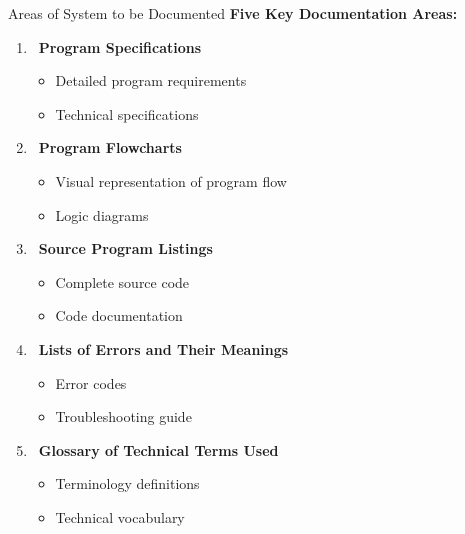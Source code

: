\documentclass[aspectratio=169]{beamer}
\begin{document}
\begin{frame}{Areas of System to be Documented}
    \textbf{Five Key Documentation Areas:}
    
    \begin{enumerate}
        \item\, \textbf{Program Specifications}
        \begin{itemize}
            \item Detailed program requirements
            \item Technical specifications
        \end{itemize}
        
        \item\, \textbf{Program Flowcharts}
        \begin{itemize}
            \item Visual representation of program flow
            \item Logic diagrams
        \end{itemize}
        
        \item\, \textbf{Source Program Listings}
        \begin{itemize}
            \item Complete source code
            \item Code documentation
        \end{itemize}
        
        \item\, \textbf{Lists of Errors and Their Meanings}
        \begin{itemize}
            \item Error codes
            \item Troubleshooting guide
        \end{itemize}
        
        \item\, \textbf{Glossary of Technical Terms Used}
        \begin{itemize}
            \item Terminology definitions
            \item Technical vocabulary
        \end{itemize}
    \end{enumerate}
    
\end{frame}
\end{document}
